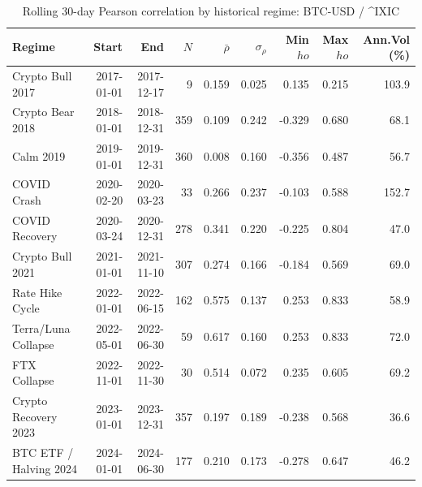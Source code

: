 \begin{table}[H]
\centering
\small
\caption{Rolling 30-day Pearson correlation by historical regime: BTC-USD / ^IXIC}
\label{tab:regime_corr_BTCUSDIXIC}
\begin{tabular}{lrrrrrrrr}
\toprule
Regime & Start & End & $N$ & $\bar{\rho}$ & $\sigma_\rho$ & Min $
ho$ & Max $
ho$ & Ann.Vol (\%) \\
\midrule
Crypto Bull 2017 & 2017-01-01 & 2017-12-17 & 9 & 0.159 & 0.025 & 0.135 & 0.215 & 103.9 \\
Crypto Bear 2018 & 2018-01-01 & 2018-12-31 & 359 & 0.109 & 0.242 & -0.329 & 0.680 & 68.1 \\
Calm 2019 & 2019-01-01 & 2019-12-31 & 360 & 0.008 & 0.160 & -0.356 & 0.487 & 56.7 \\
COVID Crash & 2020-02-20 & 2020-03-23 & 33 & 0.266 & 0.237 & -0.103 & 0.588 & 152.7 \\
COVID Recovery & 2020-03-24 & 2020-12-31 & 278 & 0.341 & 0.220 & -0.225 & 0.804 & 47.0 \\
Crypto Bull 2021 & 2021-01-01 & 2021-11-10 & 307 & 0.274 & 0.166 & -0.184 & 0.569 & 69.0 \\
Rate Hike Cycle & 2022-01-01 & 2022-06-15 & 162 & 0.575 & 0.137 & 0.253 & 0.833 & 58.9 \\
Terra/Luna Collapse & 2022-05-01 & 2022-06-30 & 59 & 0.617 & 0.160 & 0.253 & 0.833 & 72.0 \\
FTX Collapse & 2022-11-01 & 2022-11-30 & 30 & 0.514 & 0.072 & 0.235 & 0.605 & 69.2 \\
Crypto Recovery 2023 & 2023-01-01 & 2023-12-31 & 357 & 0.197 & 0.189 & -0.238 & 0.568 & 36.6 \\
BTC ETF / Halving 2024 & 2024-01-01 & 2024-06-30 & 177 & 0.210 & 0.173 & -0.278 & 0.647 & 46.2 \\
\bottomrule
\end{tabular}
\end{table}